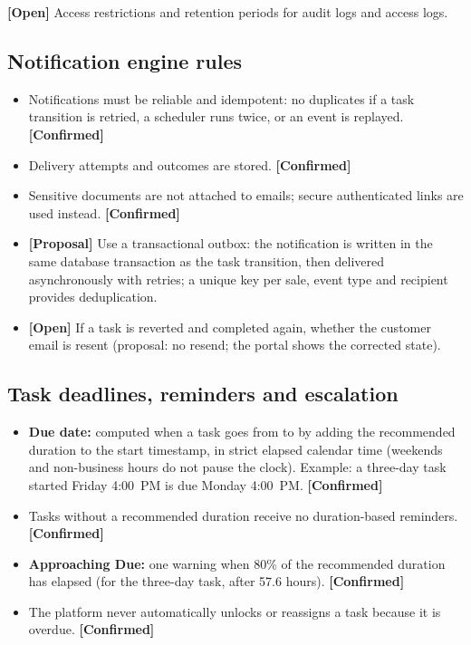 \documentclass[11pt,a4paper]{article}
\newcommand{\code}[1]{\texttt{\detokenize{#1}}}
\newcommand{\tagconf}{\textcolor{green!45!black}{\textbf{[Confirmed]}}}
\newcommand{\tagprop}{\textcolor{orange!80!black}{\textbf{[Proposal]}}}
\newcommand{\tagopen}{\textcolor{red!70!black}{\textbf{[Open]}}}
\begin{document}
\tagopen{} Access restrictions and retention periods for audit logs and access logs.

\subsection{Notification engine rules}\label{sec:notif}

\begin{itemize}
	\item Notifications must be reliable and idempotent: no duplicates if a task transition is retried, a scheduler runs twice, or an event is replayed. \tagconf{}
	\item Delivery attempts and outcomes are stored. \tagconf{}
	\item Sensitive documents are not attached to emails; secure authenticated
	      links are used instead. \tagconf{}
	\item \tagprop{} Use a transactional outbox: the notification is written in the same database transaction as the task transition, then delivered asynchronously with retries; a unique key per sale, event type and recipient provides deduplication.
	\item \tagopen{} If a task is reverted and completed again, whether the customer email is resent (proposal: no resend; the portal shows the corrected state).
\end{itemize}

\subsection{Task deadlines, reminders and escalation}\label{sec:sla}

\begin{itemize}
	\item \textbf{Due date:} computed when a task goes from \code{pending} to \code{in_progress} by adding the recommended duration to the start timestamp, in strict elapsed calendar time (weekends and non-business hours do not pause the clock). Example: a three-day task started Friday 4:00~PM is due Monday 4:00~PM. \tagconf{}
	\item Tasks without a recommended duration receive no duration-based reminders. \tagconf{}
	\item \textbf{Approaching Due:} one warning when 80\% of the recommended duration has elapsed (for the three-day task, after 57.6 hours). \tagconf{}
	\item The platform never automatically unlocks or reassigns a task because it is overdue. \tagconf{}
\end{itemize}
\end{document}
